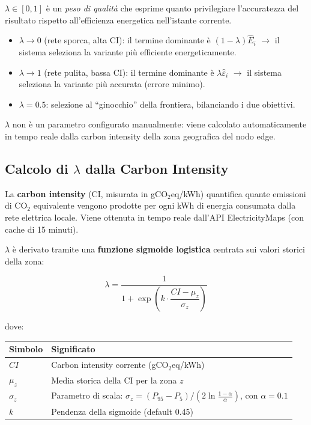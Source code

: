\documentclass[a4paper,11pt]{article}
\begin{document}
$\lambda \in [0, 1]$ è un \textit{peso di qualità} che esprime quanto privilegiare
l'accuratezza del risultato rispetto all'efficienza energetica nell'istante corrente.

\begin{itemize}
  \item $\lambda \to 0$ (rete sporca, alta CI): il termine dominante è
    $(1-\lambda)\hat{E}_i$ $\to$ il sistema seleziona la variante più efficiente
    energeticamente.
  \item $\lambda \to 1$ (rete pulita, bassa CI): il termine dominante è
    $\lambda\hat{\varepsilon}_i$ $\to$ il sistema seleziona la variante più accurata
    (errore minimo).
  \item $\lambda = 0.5$: selezione al ``ginocchio'' della frontiera, bilanciando i due
    obiettivi.
\end{itemize}

$\lambda$ non è un parametro configurato manualmente: viene calcolato automaticamente
in tempo reale dalla carbon intensity della zona geografica del nodo edge.

\subsection{Calcolo di \texorpdfstring{$\lambda$}{lambda} dalla Carbon Intensity}

La \textbf{carbon intensity} (CI, misurata in gCO$_2$eq/kWh) quantifica quante
emissioni di CO$_2$ equivalente vengono prodotte per ogni kWh di energia consumata
dalla rete elettrica locale. Viene ottenuta in tempo reale dall'API ElectricityMaps
(con cache di 15 minuti).

$\lambda$ è derivato tramite una \textbf{funzione sigmoide logistica} centrata sui
valori storici della zona:

\[
  \lambda = \frac{1}{1 + \exp\!\left(k \cdot \dfrac{CI - \mu_z}{\sigma_z}\right)}
\]

dove:

\begin{table}[h!]
\centering
\small
\begin{tabular}{lp{10cm}}
\toprule
\textbf{Simbolo} & \textbf{Significato} \\
\midrule
$CI$      & Carbon intensity corrente (gCO$_2$eq/kWh) \\
$\mu_z$   & Media storica della CI per la zona $z$ \\
$\sigma_z$ & Parametro di scala:
             $\sigma_z = (P_{95} - P_5) \big/ \!\left(2\ln\tfrac{1-\alpha}{\alpha}\right)$,
             con $\alpha=0.1$ \\
$k$       & Pendenza della sigmoide (default 0.45) \\
\bottomrule
\end{tabular}
\end{table}
\end{document}
